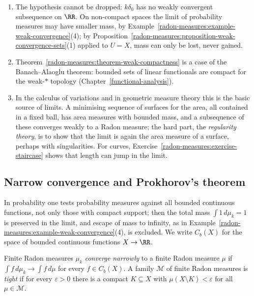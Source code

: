 \begin{remark}\label{radon-measures:remark-weak-compactness}
\begin{enumerate}
\item The hypothesis cannot be dropped: $k\delta_0$ has no weakly convergent subsequence on $\RR$. On non-compact spaces the limit of probability measures may have smaller mass, by
Example~\ref{radon-measures:example-weak-convergence}(4); by Proposition~\ref{radon-measures:proposition-weak-convergence-sets}(1) applied to $U = X$, mass can only be lost, never gained.
\item Theorem~\ref{radon-measures:theorem-weak-compactness} is a case of the Banach--Alaoglu theorem: bounded sets of linear functionals are compact for the weak-$*$ topology
(Chapter~\ref{functional-analysis}).
\item In the calculus of variations and in geometric measure theory this is the basic source of limits. A minimising sequence of surfaces for the area, all contained in a fixed ball, has area
measures with bounded mass, and a subsequence of these converges weakly to a Radon measure; the hard part, the \emph{regularity theory}, is to show that the limit is again the area measure of a
surface, perhaps with singularities. For curves, Exercise~\ref{radon-measures:exercise-staircase} shows that length can jump in the limit.
\end{enumerate}
\end{remark}

\subsection{Narrow convergence and Prokhorov's theorem}\label{radon-measures:subsection-prokhorov}

In probability one tests probability measures against all bounded continuous functions, not only those with compact support; then the total mass $\int1\,d\mu_k = 1$ is preserved in the limit,
and escape of mass to infinity, as in Example~\ref{radon-measures:example-weak-convergence}(4), is excluded. We write $C_b(X)$ for the space of bounded continuous functions $X \to \RR$.

\begin{definition}\label{radon-measures:definition-narrow}
Finite Radon measures $\mu_k$ \emph{converge narrowly} to a finite Radon measure $\mu$ if $\int f\,d\mu_k \to \int f\,d\mu$ for every $f \in C_b(X)$. A family $\mathcal{M}$ of finite Radon measures is
\emph{tight} if for every $\varepsilon > 0$ there is a compact $K \subseteq X$ with $\mu(X \setminus K) < \varepsilon$ for all $\mu \in \mathcal{M}$.
\end{definition}

